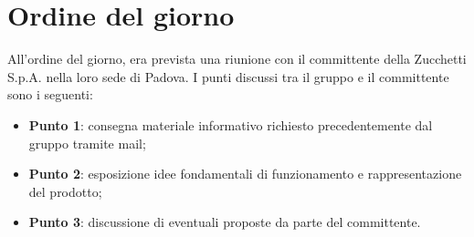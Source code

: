 \section{Ordine del giorno}
All'ordine del giorno, era prevista una riunione  con il committente della Zucchetti S.p.A. nella loro sede di Padova. 
I punti discussi tra il gruppo e il committente sono i seguenti: 
\begin{itemize}
	\item \textbf{Punto 1}: consegna materiale informativo richiesto precedentemente dal gruppo tramite mail; 
	\item \textbf{Punto 2}: esposizione idee fondamentali di funzionamento e rappresentazione del prodotto; 
	\item \textbf{Punto 3}: discussione di eventuali proposte da parte del committente.
\end{itemize}